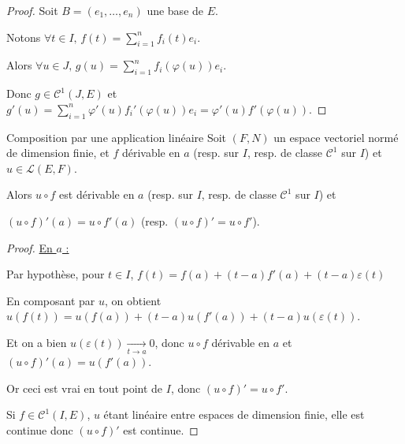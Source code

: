 
\begin{proof}
    Soit $B = (e_1, \ldots, e_n)$ une base de $E$. 

    Notons $\displaystyle \forall t \in I, \, f(t) = \sum_{i=1}^n f_i(t)e_i$. 

    Alors $\displaystyle \forall u \in J, \, g(u ) = \sum_{i=1}^n f_i(\varphi(u))e_i$. 

    Donc $g \in \mathscr C^1(J, E)$ et $\displaystyle g'(u) = \sum_{i=1}^n \varphi'(u)f_i'(\varphi(u))e_i = \varphi'(u)f'(\varphi(u))$.
\end{proof}

\begin{theoreme}{Composition par une application linéaire}{}
    Soit $(F, N)$ un espace vectoriel normé de dimension finie, et $f$ dérivable en $a$
    (resp. sur $I$, resp. de classe $\mathscr C^1$ sur $I$) et $u \in \mathscr{L }(E, F)$.

    Alors $u \circ f$ est dérivable en $a$ (resp. sur $I$, resp. de classe $\mathscr C^1$ sur $I$) et
    
    $(u \circ f)'(a) = u \circ f'(a) $ (resp. $(u \circ f)' = u \circ f'$).

\end{theoreme}


\begin{proof}
    \uline{En $a$ :}

    Par hypothèse, pour $t \in I$, $f(t) = f(a) + (t-a)f'(a) + (t-a)\varepsilon(t)$

    En composant par $u$, on obtient $u(f(t)) = u(f(a)) + (t-a)u(f'(a)) + (t-a)u(\varepsilon(t))$.

    Et on a bien $u(\varepsilon(t)) \xrightarrow[t \to a]{} 0$, donc $u \circ f$ dérivable en $a$ et $(u \circ f)'(a) = u(f'(a))$.

    Or ceci est vrai en tout point de $I$, donc $(u \circ f)' = u \circ f'$.

    Si $f \in \mathscr C^1(I, E)$, $u$ étant linéaire entre espaces de dimension finie, elle est continue donc $(u \circ f)'$ 
    est continue. 
\end{proof}

